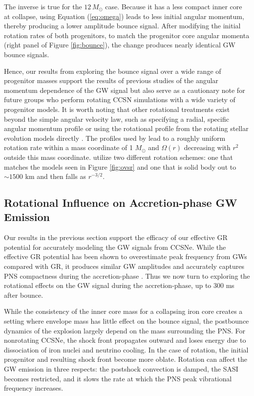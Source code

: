 \documentclass[twocolumn,times]{aastex62}  %
\begin{document}
The inverse is true for the $12\,M_\odot$ case.  Because it has a less compact inner core at collapse, using Equation (\ref{eq:omega}) leads to less initial angular momentum, thereby producing a lower amplitude bounce signal.  After modifying the initial rotation rates of both progenitors, to match the progenitor core angular momenta (right panel of Figure \ref{fig:bounce}), the change produces nearly identical GW bounce signals.  

Hence, our results from exploring the bounce signal over a wide range of progenitor masses support the results of previous studies of the angular momentum dependence of the GW signal \citep{dimm:2008,abdik:2010,abdik:2014} but also serve as a cautionary note for future groups who perform rotating CCSN simulations with a wide variety of progenitor models.  
It is worth noting that other rotational treatments exist beyond the simple angular velocity law, such as specifying a radial, specific angular momentum profile \citep[eg.,][]{oconnor:2011} or using the rotational profile from the rotating stellar evolution models directly \citep{summa:2018}.  The profiles used by \citet{oconnor:2011} lead to a roughly uniform rotation rate within a mass coordinate of 1 $M_\odot$ and $\Omega(r)$ decreasing with  $r^{2}$ outside this mass coordinate.  \citet{summa:2018} utilize two different rotation schemes: one that matches the \citet{heger:2005} models seen in Figure \ref{fig:ovsr} and one that is solid body out to $\sim 1500$ km and then falls as $r^{-3/2}$.

\subsection{Rotational Influence on Accretion-phase GW Emission}

Our results in the previous section support the efficacy of our effective GR potential for accurately modeling the GW signals from CCSNe.  While the effective GR potential has been shown to overestimate peak frequency from GWs compared with GR, it produces similar GW amplitudes and accurately captures PNS compactness during the accretion-phase \citep{muller:2013}.  Thus we now turn to exploring the rotational effects on the GW signal during the accretion-phase, up to 300 ms after bounce.

While the consistency of the inner core mass for a collapsing iron core creates a setting where envelope mass has little effect on the bounce signal, the postbounce dynamics of the explosion largely depend on the mass surrounding the PNS.  For nonrotating CCSNe, the shock front propagates outward and loses energy due to dissociation of iron nuclei and neutrino cooling.  In the case of rotation, the initial progenitor and resulting shock front become more oblate.  Rotation can affect the GW emission in three respects: the postshock convection is damped, the SASI becomes restricted, and it slows the rate at which the PNS peak vibrational frequency increases.
\end{document}
